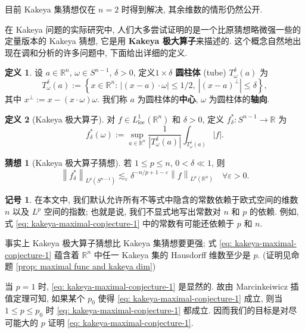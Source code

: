 \documentclass[a4paper]{article}
\numberwithin{equation}{section}
\numberwithin{figure}{section}
\numberwithin{table}{section}
\theoremstyle{definition}
\newtheorem{conjecture}[theorem]{\indent 猜想}
\newtheorem*{definition}{\indent 定义}
\newtheorem*{notation}{\indent 记号}
\newcommand{\abs}[1]{\left\lvert #1 \right\rvert}
\newcommand{\norm}[1]{\left\lVert #1 \right\rVert}
\newcommand{\set}[1]{\left\{ #1 \right\}}
\renewcommand{\mid}{:\,}
\renewcommand{\leq}{\leqslant}
\newcommand{\f}[2]{\frac{#1}{#2}}
\newcommand{\ls}{\lesssim}
\newcommand{\R}{\mathbb{R}}
\newcommand{\e}{\varepsilon}
\begin{document}
目前 Kakeya 集猜想仅在 $n=2$ 时得到解决\cite{davies1971some}, 其余维数的情形仍然公开.

在 Kakeya 问题的实际研究中, 人们大多尝试证明的是一个比原猜想略微强一些的定量版本的 Kakeya 猜想, 它是用 \textbf{Kakeya 极大算子}来描述的. 这个概念自然地出现在调和分析的许多问题中, 下面给出详细的定义.

\begin{definition}
    设 $a\in\R^n$, $\omega\in S^{n-1}$, $\delta>0$, 定义\textbf{$1\times\delta$ 圆柱体} (tube) $T_\omega^\delta(a)$ 为
    \[
        T_\omega^\delta(a) := \set{x\in\R^n\mid\abs{(x-a)\cdot \omega}\leq 1/2,\ \abs{(x-a)^\perp}\leq \delta},
    \]
    其中 $x^\perp := x - (x\cdot \omega)\omega$. 我们称 $a$ 为圆柱体的\textbf{中心}, $\omega$ 为圆柱体的\textbf{轴向}.
\end{definition}

\begin{definition}[Kakeya 极大算子]
    对 $f\in L^1_{\text{loc}}(\R^n)$ 和 $\delta>0$, 定义 $f_\delta^*: S^{n-1}\to\R$ 为
    \[
        f_\delta^*(\omega) := \sup_{a\in\R^n}\f{1}{\abs{T_\omega^\delta(a)}}\int_{T_\omega^\delta(a)}\abs{f}.
    \]
\end{definition}

\begin{conjecture}[Kakeya 极大算子猜想]
    \label{conj: 极大算子猜想}
    若 $1\leq p\leq n$, $0<\delta\ll 1$, 则
    \begin{equation}
        \label{eq: kakeya-maximal-conjecture-1}
        \norm{f^*_\delta}_{L^p(S^{n-1})}\ls_\e\delta^{-n/p+1-\e}\norm{f}_{L^p(\R^n)}\quad\forall\e>0.
    \end{equation}
\end{conjecture}

\begin{notation}
    在本文中, 我们默认允许所有不等式中隐含的常数依赖于欧式空间的维数 $n$ 以及 $L^p$ 空间的指数; 也就是说, 我们不显式地写出常数对 $n$ 和 $p$ 的依赖. 例如, 式 \eqref{eq: kakeya-maximal-conjecture-1} 中的常数有可能还依赖于 $p$ 和 $n$. 
\end{notation}

事实上 Kakeya 极大算子猜想比 Kakeya 集猜想要更强; 式 \eqref{eq: kakeya-maximal-conjecture-1} 蕴含着 $\R^n$ 中任一 Kakeya 集的 Hausdorff 维数至少是 $p$. (证明见命题 \ref{prop: maximal func and kakeya dim})

当 $p=1$ 时, \eqref{eq: kakeya-maximal-conjecture-1} 是显然的. 故由 Marcinkeiwicz 插值定理可知, 如果某个 $p_0$ 使得 \eqref{eq: kakeya-maximal-conjecture-1} 成立, 则当 $1\leq p\leq p_0$ 时 \eqref{eq: kakeya-maximal-conjecture-1} 都成立. 因而我们的目标是对尽可能大的 $p$ 证明 \eqref{eq: kakeya-maximal-conjecture-1}. 
\end{document}

